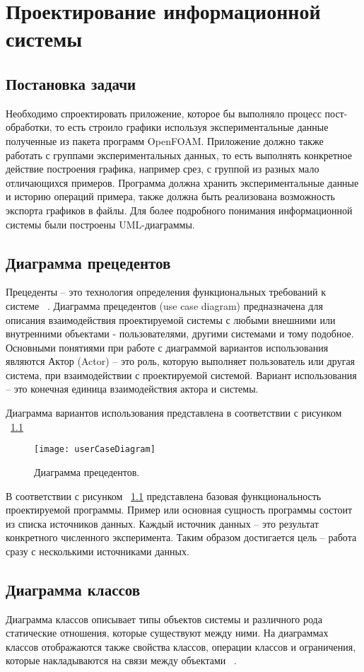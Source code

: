 \documentclass[14pt]{extreport}
\begin{document}
\chapter{Проектирование информационной системы}
\section{Постановка задачи}
Необходимо спроектировать приложение, которое бы выполняло процесс пост-обработки, то есть строило графики используя экспериментальные данные полученные из пакета программ OpenFOAM. Приложение должно также работать с группами экспериментальных данных, то есть выполнять конкретное действие построения графика, например срез, с группой из разных мало отличающихся примеров. Программа должна хранить экспериментальные данные и историю операций примера, также должна быть реализована возможность экспорта графиков в файлы.
Для более подробного понимания информационной системы были построены UML-диаграммы. 

\section{Диаграмма прецедентов}
Прецеденты -- это технология определения функциональных требований к системе ~\cite{umlDistilled}. 
Диаграмма прецедентов (use case diagram) предназначена для описания взаимодействия проектируемой системы с любыми внешними или внутренними объектами - пользователями, другими системами и тому подобное.
Основными понятиями при работе с диаграммой вариантов использования являются 
Актор (Actor) -- это роль, которую выполняет пользователь или другая система, при взаимодействии с проектируемой системой.
Вариант использования -- это конечная единица взаимодействия актора и системы. 

Диаграмма вариантов использования представлена в соответствии с рисунком ~\ref{fig5}
\begin{figure}[H]
\centerline{\texttt{[image: userCaseDiagram]}}
\caption{Диаграмма прецедентов.}
\label{fig5}
\end{figure}

В соответствии с рисунком ~\ref{fig5} представлена базовая функциональность проектируемой программы. Пример или основная сущность программы состоит из списка источников данных. Каждый источник данных -- это результат конкретного численного эксперимента. Таким образом достигается цель -- работа сразу с несколькими источниками данных.   
\section{Диаграмма классов}
Диаграмма классов описывает типы объектов системы и различного рода статические отношения, которые существуют между ними. На диаграммах классов отображаются также свойства классов, операции классов и ограничения, которые накладываются на связи между объектами ~\cite{umlDistilled}.
\end{document}

